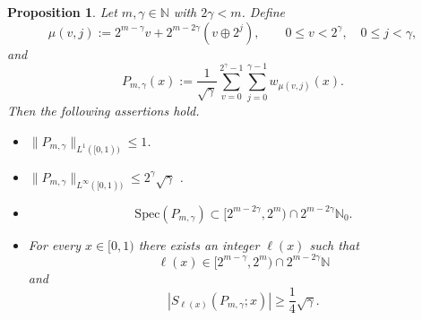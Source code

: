 \documentclass[11pt]{amsart}
\numberwithin{equation}{section}
\theoremstyle{plain}
\newtheorem{proposition}[theorem]{Proposition}
\begin{document}
\begin{proposition}
\label{prop:block} Let $m,\gamma\in\mathbb{N}$ with $2\gamma<m$. Define 
\begin{equation}  \label{eq:def-mu}
\mu(v,j):=2^{m-\gamma}v+2^{m-2\gamma}(v\oplus 2^j), \qquad 0\le
v<2^{\gamma}, \quad 0\le j<\gamma,
\end{equation}
and 
\begin{equation}  \label{eq:def-P}
P_{m,\gamma}(x):=\frac{1}{\sqrt{\gamma}}\sum_{v=0}^{2^{\gamma}-1}%
\sum_{j=0}^{\gamma-1} w_{\mu(v,j)}(x).
\end{equation}
Then the following assertions hold.

\begin{itemize}
\item[(i)] $\|P_{m,\gamma}\|_{L^{1}([0,1))}\le1$.

\item[(ii)] $\|P_{m,\gamma}\|_{L^{\infty}([0,1))}\le 2^{\gamma}\sqrt{\gamma}$%
.

\item[(iii)] 
\begin{equation*}
\mathrm{Spec}(P_{m,\gamma})\subset [2^{m-2\gamma},2^m)\cap 2^{m-2\gamma}%
\mathbb{N}_0.
\end{equation*}

\item[(iv)] For every $x\in[0,1)$ there exists an integer $\ell(x)$ such
that 
\begin{equation*}
\ell(x)\in [2^{m-\gamma},2^m)\cap 2^{m-2\gamma}\mathbb{N}
\end{equation*}
and 
\begin{equation*}
|S_{\ell(x)}(P_{m,\gamma};x)|\ge \frac14\sqrt{\gamma}.
\end{equation*}
\end{itemize}
\end{proposition}
\end{document}
